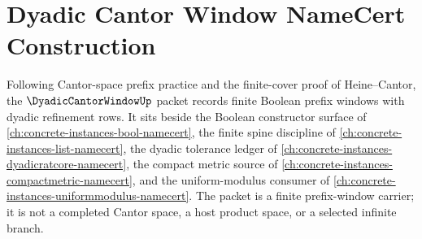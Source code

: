 \chapter{Dyadic Cantor Window NameCert Construction}
\label{ch:concrete-instances-dyadic-cantor-window-namecert}

Following Cantor-space prefix practice and the finite-cover proof of Heine--Cantor, the $\DyadicCantorWindowUp$ packet records finite Boolean prefix windows with dyadic refinement rows. It sits beside the Boolean constructor surface of \autoref{ch:concrete-instances-bool-namecert}, the finite spine discipline of \autoref{ch:concrete-instances-list-namecert}, the dyadic tolerance ledger of \autoref{ch:concrete-instances-dyadicratcore-namecert}, the compact metric source of \autoref{ch:concrete-instances-compactmetric-namecert}, and the uniform-modulus consumer of \autoref{ch:concrete-instances-uniformmodulus-namecert}. The packet is a finite prefix-window carrier; it is not a completed Cantor space, a host product space, or a selected infinite branch.

